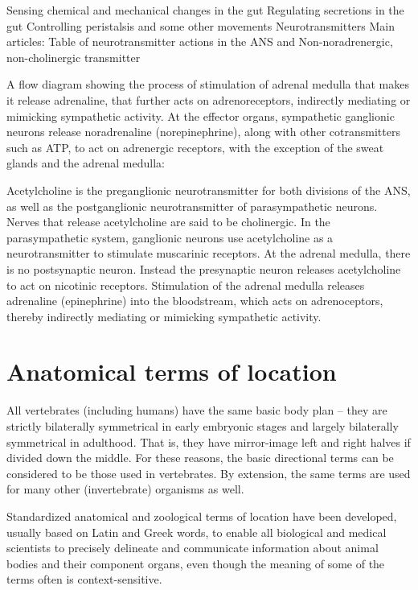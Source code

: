 Sensing chemical and mechanical changes in the gut
Regulating secretions in the gut
Controlling peristalsis and some other movements
Neurotransmitters
Main articles: Table of neurotransmitter actions in the ANS and Non-noradrenergic, non-cholinergic transmitter

A flow diagram showing the process of stimulation of adrenal medulla that makes it release adrenaline, that further acts on adrenoreceptors, indirectly mediating or mimicking sympathetic activity.
At the effector organs, sympathetic ganglionic neurons release noradrenaline (norepinephrine), along with other cotransmitters such as ATP, to act on adrenergic receptors, with the exception of the sweat glands and the adrenal medulla:

Acetylcholine is the preganglionic neurotransmitter for both divisions of the ANS, as well as the postganglionic neurotransmitter of parasympathetic neurons. Nerves that release acetylcholine are said to be cholinergic. In the parasympathetic system, ganglionic neurons use acetylcholine as a neurotransmitter to stimulate muscarinic receptors.
At the adrenal medulla, there is no postsynaptic neuron. Instead the presynaptic neuron releases acetylcholine to act on nicotinic receptors. Stimulation of the adrenal medulla releases adrenaline (epinephrine) into the bloodstream, which acts on adrenoceptors, thereby indirectly mediating or mimicking sympathetic activity.

\hypertarget{appendix-appendix}{%
\appendix}


\hypertarget{anatomical-terms-of-location}{%
\chapter{Anatomical terms of location}\label{anatomical-terms-of-location}}

All vertebrates (including humans) have the same basic body plan -- they are strictly bilaterally symmetrical in early embryonic stages and largely bilaterally symmetrical in adulthood. That is, they have mirror-image left and right halves if divided down the middle. For these reasons, the basic directional terms can be considered to be those used in vertebrates. By extension, the same terms are used for many other (invertebrate) organisms as well.

Standardized anatomical and zoological terms of location have been developed, usually based on Latin and Greek words, to enable all biological and medical scientists to precisely delineate and communicate information about animal bodies and their component organs, even though the meaning of some of the terms often is context-sensitive.

